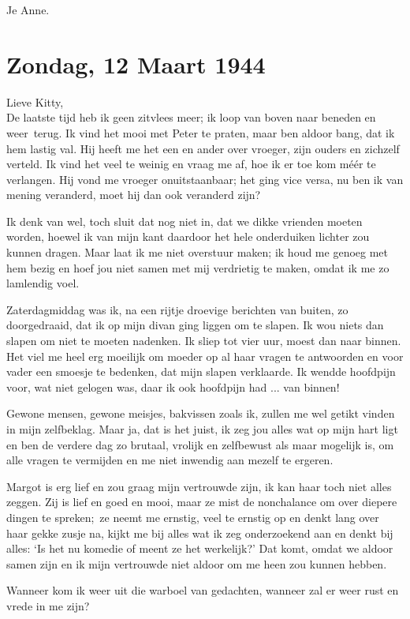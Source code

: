 \documentclass{book}
\begin{document}
Je Anne.

\section*{Zondag, 12 Maart 1944}

Lieve Kitty,\\
De laatste tijd heb ik geen zitvlees meer; ik loop van boven naar
beneden en weer~terug. Ik vind het mooi met Peter te praten, maar ben aldoor
bang, dat ik hem lastig val. Hij heeft me het een en ander over vroeger, zijn
ouders en zichzelf verteld. Ik vind het veel te weinig en vraag me af, hoe ik er
toe kom méér te verlangen. Hij vond me vroeger onuitstaanbaar; het ging vice
versa, nu ben ik van mening veranderd, moet hij dan ook veranderd zijn?

Ik denk van wel, toch sluit dat nog niet in, dat we dikke vrienden moeten
worden, hoewel ik van mijn kant daardoor het hele onderduiken lichter zou kunnen
dragen. Maar laat ik me niet overstuur maken; ik houd me genoeg met hem bezig en
hoef jou niet samen met mij verdrietig te maken, omdat ik me zo lamlendig voel.

Zaterdagmiddag was ik, na een rijtje droevige berichten van buiten, zo
doorgedraaid, dat ik op mijn divan ging liggen om te slapen. Ik wou niets dan
slapen om niet te moeten nadenken. Ik sliep tot vier uur, moest dan naar binnen.
Het viel me heel erg moeilijk om moeder op al haar vragen te antwoorden en voor
vader een smoesje te bedenken, dat mijn slapen verklaarde. Ik wendde hoofdpijn
voor, wat niet gelogen was, daar ik ook hoofdpijn had ... van binnen!

Gewone mensen, gewone meisjes, bakvissen zoals ik, zullen me wel getikt vinden
in mijn zelfbeklag. Maar ja, dat is het juist, ik zeg jou alles wat op mijn hart
ligt en ben de verdere dag zo brutaal, vrolijk en zelfbewust als maar mogelijk
is, om alle vragen te vermijden en me niet inwendig aan mezelf te ergeren.

Margot is erg lief en zou graag mijn vertrouwde zijn, ik kan haar toch niet
alles zeggen. Zij is lief en goed en mooi, maar ze mist de nonchalance om over
diepere dingen te spreken;~ze neemt me ernstig, veel te ernstig op en denkt lang
over haar gekke zusje na, kijkt me bij alles wat ik zeg onderzoekend aan en
denkt bij alles: `Is het nu komedie of meent ze het werkelijk?' Dat komt, omdat
we aldoor samen zijn en ik mijn vertrouwde niet aldoor om me heen zou kunnen
hebben.

Wanneer kom ik weer uit die warboel van gedachten, wanneer zal er weer rust en
vrede in me zijn?
\end{document}
